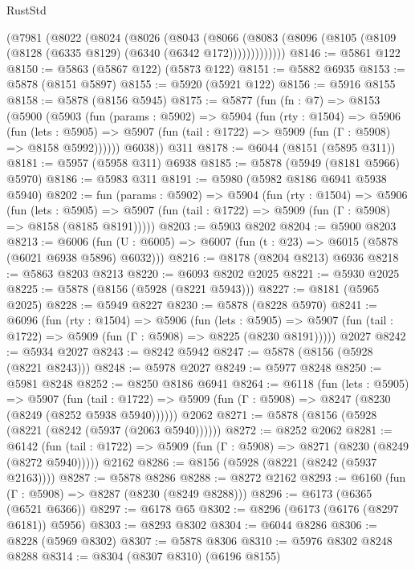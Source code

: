 \begin{lexlean}{RustStd}
\begin{coremodule}
    (@7981
      (@8022
        (@8024
          (@8026
            (@8043
              (@8066
                (@8083 (@8096 (@8105 (@8109 (@8128 (@6335 @8129) (@6340 (@6342 @172)))))))))))))
@8146 := @5861 @122
@8150 := @5863 (@5867 @122) (@5873 @122)
@8151 := @5882 @6935
@8153 := @5878 (@8151 @5897)
@8155 := @5920 (@5921 @122)
@8156 := @5916 @8155
@8158 := @5878 (@8156 @5945)
@8175 := @5877
    (fun (fn : @7) =>
    @8153
      (@5900
        (@5903
          (fun (params : @5902) =>
          @5904
            (fun (rty : @1504) =>
            @5906
              (fun (lets : @5905) =>
              @5907 (fun (tail : @1722) => @5909 (fun (Γ : @5908) => @8158 @5992))))))
        @6038))
    @311
@8178 := @6044 (@8151 (@5895 @311))
@8181 := @5957 (@5958 @311) @6938
@8185 := @5878 (@5949 (@8181 @5966) @5970)
@8186 := @5983 @311
@8191 := @5980 (@5982 @8186 @6941 @5938 @5940)
@8202 := fun (params : @5902) =>
  @5904
    (fun (rty : @1504) =>
    @5906
      (fun (lets : @5905) =>
      @5907 (fun (tail : @1722) => @5909 (fun (Γ : @5908) => @8158 (@8185 @8191)))))
@8203 := @5903 @8202
@8204 := @5900 @8203
@8213 := @6006 (fun (U : @6005) => @6007 (fun (t : @23) => @6015 (@5878 (@6021 @6938 @5896) @6032)))
@8216 := @8178 (@8204 @8213) @6936
@8218 := @5863 @8203 @8213
@8220 := @6093 @8202 @2025
@8221 := @5930 @2025
@8225 := @5878 (@8156 (@5928 (@8221 @5943)))
@8227 := @8181 (@5965 @2025)
@8228 := @5949 @8227
@8230 := @5878 (@8228 @5970)
@8241 := @6096
    (fun (rty : @1504) =>
    @5906
      (fun (lets : @5905) =>
      @5907 (fun (tail : @1722) => @5909 (fun (Γ : @5908) => @8225 (@8230 @8191)))))
    @2027
@8242 := @5934 @2027
@8243 := @8242 @5942
@8247 := @5878 (@8156 (@5928 (@8221 @8243)))
@8248 := @5978 @2027
@8249 := @5977 @8248
@8250 := @5981 @8248
@8252 := @8250 @8186 @6941
@8264 := @6118
    (fun (lets : @5905) =>
    @5907
      (fun (tail : @1722) => @5909 (fun (Γ : @5908) => @8247 (@8230 (@8249 (@8252 @5938 @5940))))))
    @2062
@8271 := @5878 (@8156 (@5928 (@8221 (@8242 (@5937 (@2063 @5940))))))
@8272 := @8252 @2062
@8281 := @6142
    (fun (tail : @1722) => @5909 (fun (Γ : @5908) => @8271 (@8230 (@8249 (@8272 @5940)))))
    @2162
@8286 := @8156 (@5928 (@8221 (@8242 (@5937 @2163))))
@8287 := @5878 @8286
@8288 := @8272 @2162
@8293 := @6160 (fun (Γ : @5908) => @8287 (@8230 (@8249 @8288)))
@8296 := @6173 (@6365 (@6521 @6366))
@8297 := @6178 @65
@8302 := @8296 (@6173 (@6176 (@8297 @6181)) @5956)
@8303 := @8293 @8302
@8304 := @6044 @8286
@8306 := @8228 (@5969 @8302)
@8307 := @5878 @8306
@8310 := @5976 @8302 @8248 @8288
@8314 := @8304 (@8307 @8310) (@6196 @8155)

\end{coremodule}
\end{lexlean}
